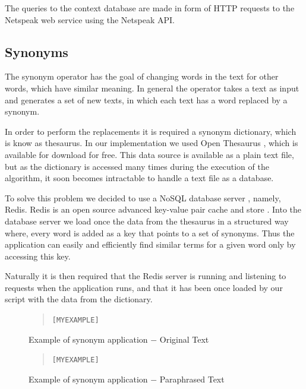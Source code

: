 \documentclass[11pt]{reportAlternative}
\begin{document}
The queries to the context database are made in form of HTTP requests to the Netspeak web service using the Netspeak API. \par

\subsection{Synonyms}
The synonym operator has the goal of changing words in the text for other words, which have similar meaning. In general the operator takes a text as input and generates a set of new texts, in which each text has a word replaced by a synonym.

In order to perform the replacements it is required a synonym dictionary, which is know as thesaurus. In our implementation we used Open Thesaurus \cite{OpenThesuarus}, which is available for download for free. This data source is available as a plain text file, but as the dictionary is accessed many times during the execution of the algorithm, it soon becomes intractable to handle a text file as a database.

To solve this problem we decided to use a NoSQL database server \cite{NoSQL}, namely, Redis. Redis is an open source advanced key-value pair cache and store \cite{Redis}. Into the database server we load once the data from the thesaurus in a structured way where, every word is added as a key that points to a set of synonyms. Thus the application can easily and efficiently find similar terms for a given word only by accessing this key.

Naturally it is then required that the Redis server is running and listening to requests when the application runs, and that it has been once loaded by our script with the data from the dictionary.

\begin{figure}[H]
\begin{quote}
\begin{alltt}
[MY EXAMPLE]
\end{alltt}
\end{quote}
\caption{Example of synonym application $-$ Original Text}
\end{figure}

\begin{figure}[H]
\begin{quote}
\begin{alltt}
[MY EXAMPLE]
\end{alltt}
\end{quote}
\caption{Example of synonym application $-$ Paraphrased Text}
\end{figure}
\end{document}
